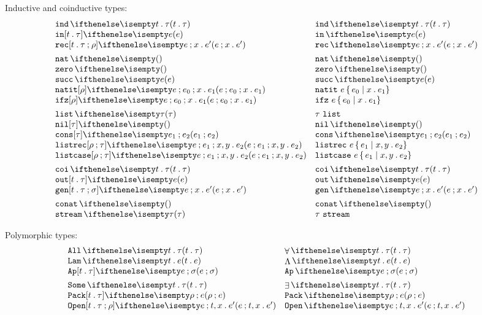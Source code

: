 \documentclass[11pt,twoside]{article}
\begin{document}
\noindent Inductive and coinductive types:
\begin{displaymath}
  \begin{array}{l@{\quad}l@{\quad}l}
    \indTy{t}{\tau} & \indTy*{t}{\tau} \\
    \inEx[t][\tau]{e} & \inEx*{e} \\
    \recEx[t][\tau][\rho]{e}{x}{e'} & \recEx*{e}{x}{e'} \\[1ex]

    \natTy{} & \natTy*{} \\
    \zeroEx  & \zeroEx* \\
    \succEx{e} & \succEx*{e} \\
    \natitEx[\rho]{e}{e_0}{x}{e_1} & \natitEx*{e}{e_0}{x}{e_1} \\
    \ifzEx[\rho]{e}{e_0}{x}{e_1} & \ifzEx*{e}{e_0}{x}{e_1} \\[1ex]

    \listTy{\tau} & \listTy*{\tau}  \\
    \nilEx[\tau] & \nilEx*{} \\
    \consEx[\tau]{e_1}{e_2} & \consEx*{e_1}{e_2} \\
    \listrecEx[\rho][\tau]{e}{e_1}{x}{y}{e_2} & \listrecEx*{e}{e_1}{x}{y}{e_2} \\
    \listcaseEx[\rho][\tau]{e}{e_1}{x}{y}{e_2} & \listcaseEx*{e}{e_1}{x}{y}{e_2} \\[1ex]

    \coiTy{t}{\tau} & \coiTy*{t}{\tau} \\
    \outEx[t][\tau]{e} & \outEx*{e} \\
    \genEx[t][\tau][\sigma]{e}{x}{e'} & \genEx*{e}{x}{e'} \\[1ex]

    \conatTy{} & \conatTy*{} \\
    \streamTy{\tau} & \streamTy*{\tau}
  \end{array}
\end{displaymath}

\noindent Polymorphic types:
\begin{displaymath}
  \begin{array}{l@{\quad}l@{\quad}l}
    \AllTy{t}{\tau} & \AllTy*{t}{\tau} \\
    \LamEx{t}[\tau]{e} & \LamEx*{t}{e} \\
    \AppEx[t][\tau]{e}{\sigma} & \AppEx*{e}{\sigma}\\[1ex]
    \SomeTy{t}{\tau}  & \SomeTy*{t}{\tau} \\
    \PackEx[t][\tau]{\rho}{e} & \PackEx*{\rho}{e} \\
    \OpenEx[t][\tau]{e}[\rho]{x}{e'} & \OpenEx*[t][\tau]{e}[\rho]{x}{e'}
  \end{array}
\end{displaymath}
\end{document}
